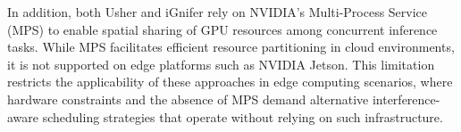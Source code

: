 In addition, both Usher and iGnifer rely on NVIDIA's Multi-Process Service (MPS) to enable spatial sharing of GPU resources among concurrent inference tasks. While MPS facilitates efficient resource partitioning in cloud environments, it is not supported on edge platforms such as NVIDIA Jetson. This limitation restricts the applicability of these approaches in edge computing scenarios, where hardware constraints and the absence of MPS demand alternative interference-aware scheduling strategies that operate without relying on such infrastructure.







